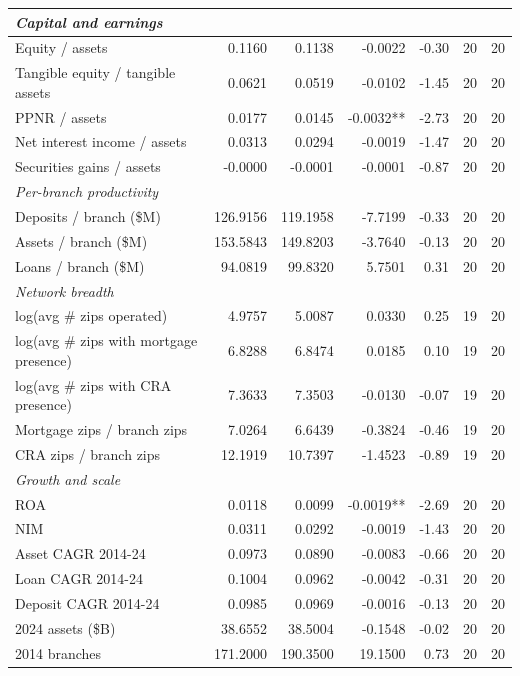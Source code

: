 \begin{tabular}{lrrrrrr}
\midrule
\multicolumn{7}{l}{\emph{Capital and earnings}} \\
\midrule
Equity / assets & 0.1160 & 0.1138 & -0.0022 & -0.30 & 20 & 20 \\
Tangible equity / tangible assets & 0.0621 & 0.0519 & -0.0102 & -1.45 & 20 & 20 \\
PPNR / assets & 0.0177 & 0.0145 & -0.0032** & -2.73 & 20 & 20 \\
Net interest income / assets & 0.0313 & 0.0294 & -0.0019 & -1.47 & 20 & 20 \\
Securities gains / assets & -0.0000 & -0.0001 & -0.0001 & -0.87 & 20 & 20 \\
\midrule
\multicolumn{7}{l}{\emph{Per-branch productivity}} \\
\midrule
Deposits / branch (\$M) & 126.9156 & 119.1958 & -7.7199 & -0.33 & 20 & 20 \\
Assets / branch (\$M) & 153.5843 & 149.8203 & -3.7640 & -0.13 & 20 & 20 \\
Loans / branch (\$M) & 94.0819 & 99.8320 & 5.7501 & 0.31 & 20 & 20 \\
\midrule
\multicolumn{7}{l}{\emph{Network breadth}} \\
\midrule
log(avg \# zips operated) & 4.9757 & 5.0087 & 0.0330 & 0.25 & 19 & 20 \\
log(avg \# zips with mortgage presence) & 6.8288 & 6.8474 & 0.0185 & 0.10 & 19 & 20 \\
log(avg \# zips with CRA presence) & 7.3633 & 7.3503 & -0.0130 & -0.07 & 19 & 20 \\
Mortgage zips / branch zips & 7.0264 & 6.6439 & -0.3824 & -0.46 & 19 & 20 \\
CRA zips / branch zips & 12.1919 & 10.7397 & -1.4523 & -0.89 & 19 & 20 \\
\midrule
\multicolumn{7}{l}{\emph{Growth and scale}} \\
\midrule
ROA & 0.0118 & 0.0099 & -0.0019** & -2.69 & 20 & 20 \\
NIM & 0.0311 & 0.0292 & -0.0019 & -1.43 & 20 & 20 \\
Asset CAGR 2014-24 & 0.0973 & 0.0890 & -0.0083 & -0.66 & 20 & 20 \\
Loan CAGR 2014-24 & 0.1004 & 0.0962 & -0.0042 & -0.31 & 20 & 20 \\
Deposit CAGR 2014-24 & 0.0985 & 0.0969 & -0.0016 & -0.13 & 20 & 20 \\
2024 assets (\$B) & 38.6552 & 38.5004 & -0.1548 & -0.02 & 20 & 20 \\
2014 branches & 171.2000 & 190.3500 & 19.1500 & 0.73 & 20 & 20 \\

\end{tabular}
